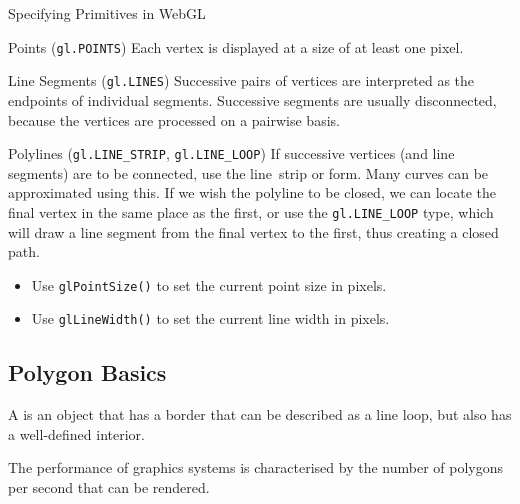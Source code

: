 \documentclass[../notes.tex]{subfiles}
\begin{document}
      \begin{sidenote}{Specifying Primitives in WebGL}
        $ $\vspace{-1em}
        \begin{descriptimize}
          \item[Points (\texttt{gl.POINTS})] Each vertex is displayed
            at a size of at least one pixel.
          \item[Line Segments (\texttt{gl.LINES})] Successive pairs of vertices
            are interpreted as the endpoints of individual segments.
            Successive segments are usually disconnected, because the vertices are processed
            on a pairwise basis.
          \item[Polylines (\texttt{gl.LINE_STRIP}, \texttt{gl.LINE_LOOP})]
            If successive vertices (and line segments) are to be connected,
            use the line~strip or  form.
            Many curves can be approximated using this.
            If we wish the polyline to be closed,
            we can locate the final vertex in the same place as the first,
            or use the \texttt{gl.LINE_LOOP} type,
            which will draw a line segment from the final vertex to the first,
            thus creating a closed path.
        \end{descriptimize}

        \begin{itemize}[nosep]
          \item Use \texttt{glPointSize()} to set the current point size in pixels.
          \item Use \texttt{glLineWidth()} to set the current line width in pixels.
        \end{itemize}
      \end{sidenote}

      \subsection{Polygon Basics}
        A  is an object that has a border that can be described as a line loop,
        but also has a well-defined interior.

        The performance of graphics systems is characterised by the number of polygons
        per second that can be rendered.
\end{document}
